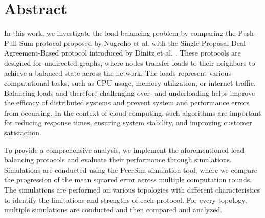 \chapter*{Abstract}

In this work, we investigate the load balancing problem by comparing the Push-Pull Sum protocol proposed by Nugroho et al. \cite{nugroho2023PushPullSumDataAg} with the Single-Proposal Deal-Agreement-Based protocol introduced by Dinitz et al. \cite{dinitz2022localDealAgreementloadBalancing}. These protocols are designed for undirected graphs, where nodes transfer loads to their neighbors to achieve a balanced state across the network. The loads represent various computational tasks, such as CPU usage, memory utilization, or internet traffic. Balancing loads and therefore challenging over- and underloading helps improve the efficacy of distributed systems and prevent system and performance errors from occurring. In the context of cloud computing, such algorithms are important for reducing response times, ensuring system stability, and improving customer satisfaction.

To provide a comprehensive analysis, we implement the aforementioned load balancing protocols and evaluate their performance through simulations. Simulations are conducted using the PeerSim simulation tool, where we compare the progression of the mean squared error across multiple computation rounds. The simulations are performed on various topologies with different characteristics to identify the limitations and strengths of each protocol. For every topology, multiple simulations are conducted and then compared and analyzed.